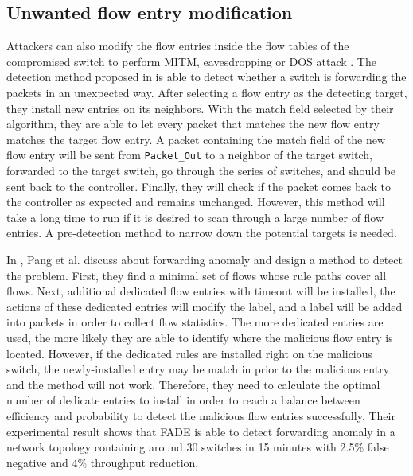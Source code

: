 \subsection{Unwanted flow entry modification}
Attackers can also modify the flow entries inside the flow tables of the compromised switch to perform MITM, eavesdropping or DOS attack \cite{AAS14}. The detection method proposed in \cite{CKGL15} is able to detect whether a switch is forwarding the packets in an unexpected way. After selecting a flow entry as the detecting target, they install new entries on its neighbors. With the match field selected by their algorithm, they are able to let every packet that matches the new flow entry matches the target flow entry. A packet containing the match field of the new flow entry will be sent from \texttt{Packet\_Out} to a neighbor of the target switch, forwarded to the target switch, go through the series of switches, and should be sent back to the controller. Finally, they will check if the packet comes back to the controller as expected and remains unchanged. However, this method will take a long time to run if it is desired to scan through a large number of flow entries. A pre-detection method to narrow down the potential targets is needed.

In \cite{PJL16}, Pang et al. discuss about forwarding anomaly and design a method to detect the problem. First, they find a minimal set of flows whose rule paths cover all flows. Next, additional dedicated flow entries with timeout will be installed, the actions of these dedicated entries will modify the label, and a label will be added into packets in order to collect flow statistics. The more dedicated entries are used, the more likely they are able to identify where the malicious flow entry is located. However, if the dedicated rules are installed right on the malicious switch, the newly-installed entry may be match in prior to the malicious entry and the method will not work. Therefore, they need to calculate the optimal number of dedicate entries to install in order to reach a balance between efficiency and probability to detect the malicious flow entries successfully. Their experimental result shows that FADE is able to detect forwarding anomaly in a network topology containing around 30 switches in 15 minutes with 2.5\% false negative and 4\% throughput reduction.

